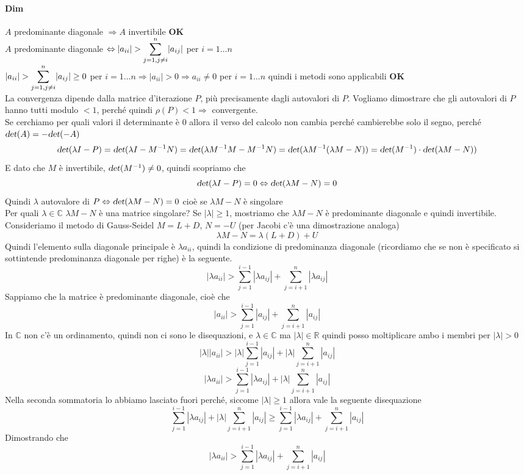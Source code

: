 \documentclass[10pt]{book}
\begin{document}
\paragraph{Dim} $A$ predominante diagonale $\Rightarrow A$ invertibile \textbf{OK}\\
$A$ predominante diagonale $\Leftrightarrow |a_{ii}| > \mathlarger{\sum_{j=1, j\neq i}^n} |a_{ij}|$ per $i=1\ldots n$\\
$|a_{ii}| > \mathlarger{\sum_{j=1, j\neq i}^n} |a_{ij}| \geq 0$ per $i=1\ldots n \Rightarrow |a_{ii}| > 0 \Rightarrow a_{ii} \neq 0$ per $i=1\ldots n$ quindi i metodi sono applicabili \textbf{OK}\\
La convergenza dipende dalla matrice d'iterazione $P$, più precisamente dagli autovalori di $P$. Vogliamo dimostrare che gli autovalori di $P$ hanno tutti modulo $< 1$, perché quindi $\rho(P) < 1 \Rightarrow$ convergente.\\
Se cerchiamo per quali valori il determinante è 0 allora il verso del calcolo non cambia perché cambierebbe solo il segno, perché $\textsl{det}(A) = -\textsl{det}(-A)$
$$\textsl{det}(\lambda I - P) = \textsl{det}(\lambda I - M^{-1}N) = \textsl{det}(\lambda M^{-1}M - M^{-1}N) = \textsl{det}(\lambda M^{-1}(\lambda M - N)) = \textsl{det}(M^{-1})\cdot\textsl{det}(\lambda M - N))$$
E dato che $M$ è invertibile, $\textsl{det}(M^{-1})\neq 0$, quindi scopriamo che
$$\textsl{det}(\lambda I - P) = 0 \Leftrightarrow \textsl{det}(\lambda M - N) = 0$$
Quindi $\lambda$ autovalore di $P \Leftrightarrow \textsl{det}(\lambda M - N) = 0$ cioè se $\lambda M - N$ è singolare\\
Per quali $\lambda \in \mathbb{C}$ $\lambda M - N$ è una matrice singolare? Se $|\lambda|\geq 1$, mostriamo che $\lambda M - N$ è predominante diagonale e quindi invertibile.\\
Consideriamo il metodo di Gauss-Seidel $M = L + D$, $N = - U$ (per Jacobi c'è una dimostrazione analoga)
$$\lambda M - N = \lambda(L+D)+U$$
Quindi l'elemento sulla diagonale principale è $\lambda a_{ii}$, quindi la condizione di predominanza diagonale (ricordiamo che se non è specificato si sottintende predominanza diagonale per righe) è la seguente.
$$|\lambda a_{ii}| > \sum_{j=1}^{i-1} |\lambda a_{ij}| + \sum_{j=i+1}^{n} |\lambda a_{ij}|$$
Sappiamo che la matrice è predominante diagonale, cioè che
$$|a_{ii}| > \sum_{j=1}^{i-1} |a_{ij}| + \sum_{j=i+1}^{n} |a_{ij}|$$
In $\mathbb{C}$ non c'è un ordinamento, quindi non ci sono le disequazioni, e $\lambda \in \mathbb{C}$ ma $|\lambda| \in \mathbb{R}$ quindi posso moltiplicare ambo i membri per $|\lambda| > 0$
$$|\lambda||a_{ii}| > |\lambda|\sum_{j=1}^{i-1} |a_{ij}| + |\lambda|\sum_{j=i+1}^{n} |a_{ij}|$$
$$|\lambda a_{ii}| > \sum_{j=1}^{i-1} |\lambda a_{ij}| + |\lambda|\sum_{j=i+1}^{n} |a_{ij}|$$
Nella seconda sommatoria lo abbiamo lasciato fuori perché, siccome $|\lambda| \geq 1$ allora vale la seguente disequazione
$$\sum_{j=1}^{i-1} |\lambda a_{ij}| + |\lambda|\sum_{j=i+1}^{n} |a_{ij}| \geq \sum_{j=1}^{i-1} |\lambda a_{ij}| + \sum_{j=i+1}^{n} |a_{ij}|$$
Dimostrando che 
$$|\lambda a_{ii}| > \sum_{j=1}^{i-1} |\lambda a_{ij}| + \sum_{j=i+1}^{n} |a_{ij}|$$
\end{document}
